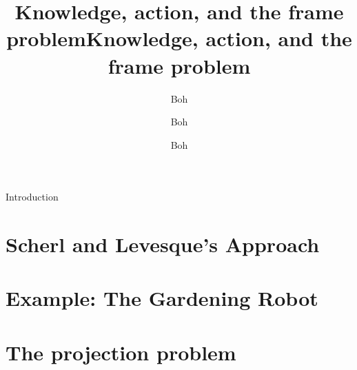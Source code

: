 \documentclass{beamer}
\title{Knowledge, action, and the frame problem}
\subtitle{Boh}
\title{Knowledge, action, and the frame problem}
\author{Boh}
\date{Boh}
\begin{document}
\maketitle

\section{}
\begin{frame}{Introduction}
\end{frame}

\section{Scherl and Levesque's Approach}



\section{Example: The Gardening Robot}


\section{The projection problem}


\footlinecolor{}

\backmatter
\end{document}
